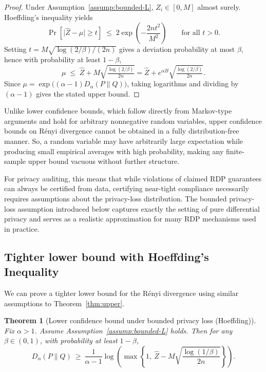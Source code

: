 \documentclass{article}
\theoremstyle{plain}
\newtheorem{theorem}{Theorem}[section]
\theoremstyle{definition}
\theoremstyle{remark}
\begin{document}
\begin{proof}
Under Assumption~\ref{assump:bounded-L},
$Z_i \in [0,M]$ almost surely.  Hoeffding's inequality yields
\[
\Pr\!\left[
\bigl|\widehat{Z} - \mu \bigr|
\ge t
\right]
\;\le\;
2\exp\left( - \frac{2n t^2}{M^2} \right)
\qquad\text{for all $t>0$}.
\]
Setting 
$t = M \sqrt{\log(2/\beta)/(2n)}$ gives a deviation probability at most
$\beta$, hence with probability at least $1-\beta$,
\[
\mu \;\le\; \widehat{Z} + 
M \sqrt{\tfrac{\log(2/\beta)}{2n}}
=
\widehat{Z} + e^{\alpha B}
\sqrt{\tfrac{\log(2/\beta)}{2n}}.
\]
Since
$\mu=\exp\!\big((\alpha-1)D_\alpha(P\|Q)\big)$,
taking logarithms and dividing by $(\alpha-1)$ gives the stated
upper bound.
\end{proof}

Unlike lower confidence bounds, which follow directly from Markov-type arguments and hold for arbitrary nonnegative random variables,
upper confidence bounds on R\'enyi divergence cannot be obtained in a fully distribution-free manner.
So, a random variable may have arbitrarily large expectation while producing small empirical averages with high probability,
making any finite-sample upper bound vacuous without further structure.

For privacy auditing, this means that while violations of claimed RDP guarantees can always be certified from data,
certifying near-tight compliance necessarily requires assumptions about the privacy-loss distribution.
The bounded privacy-loss assumption introduced below captures exactly the setting of pure differential privacy
and serves as a realistic approximation for many RDP mechanisms used in practice.

\subsection{Tighter lower bound with Hoeffding's Inequality}
We can prove a tighter lower bound for the R\'enyi divergence using similar assumptions to Theorem~\ref{thm:upper}.

\begin{theorem}[Lower confidence bound under bounded privacy loss (Hoeffding)]
\label{thm:hoeffding-lower}
Fix $\alpha>1$. Assume Assumption~\ref{assump:bounded-L} holds. Then for any $\beta\in(0,1)$, with probability at least $1-\beta$,
\[
D_\alpha(P\|Q)\ \ge\ \frac{1}{\alpha-1}\log\left(\max\left\{1,\ \widehat Z - M\sqrt{\frac{\log(1/\beta)}{2n}}\right\}\right).
\]
\end{theorem}
\end{document}
